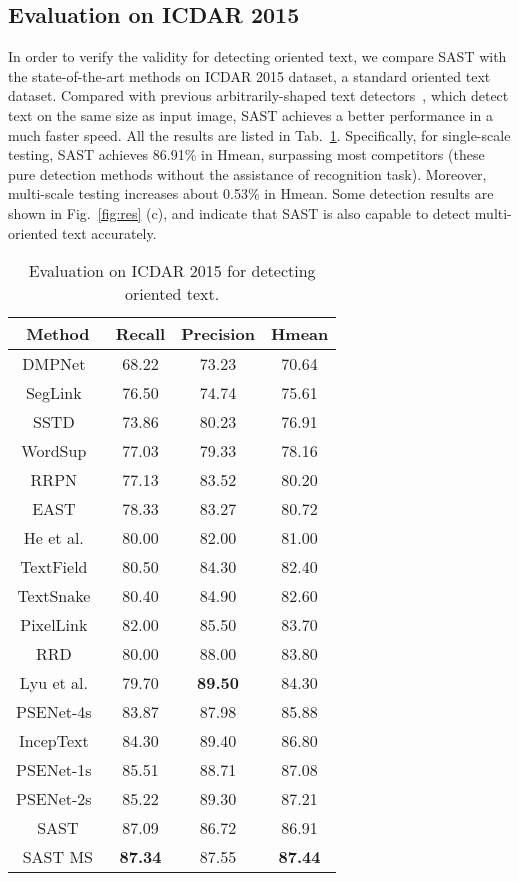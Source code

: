 \documentclass[sigconf]{acmart}
\begin{document}
\subsection{Evaluation on ICDAR 2015}
In order to verify the validity for detecting oriented text, we compare SAST with the state-of-the-art methods on ICDAR 2015 dataset, a standard oriented text dataset. 
Compared with previous arbitrarily-shaped text detectors~\cite{xu2019textfield, yang2018inceptext,wang2019shape}, which detect text on the same size as input image, SAST achieves a better performance in a much faster speed. All the results are listed in Tab.~\ref{tab:ex_icdar15}. Specifically, for single-scale testing, SAST achieves 86.91\% in Hmean, surpassing most competitors (these pure detection methods without the assistance of recognition task). Moreover, multi-scale testing increases about 0.53\% in Hmean. Some detection results are shown in Fig.~\ref{fig:res} (c), and indicate that SAST is also capable to detect multi-oriented text accurately.
\begin{table}
  \caption{ Evaluation on ICDAR 2015 for detecting oriented text.}
  \label{tab:ex_icdar15}
  \begin{tabular}{cccc}
    \toprule
      Method & Recall & Precision & Hmean\\
    \midrule
    DMPNet~\cite{liu2017deep} &68.22 &73.23 &70.64 \\
    SegLink~\cite{shi2017detecting} &76.50 &74.74 &75.61 \\
SSTD~\cite{he2017single} &73.86 &80.23 &76.91 \\
    WordSup~\cite{hu2017wordsup} &77.03 &79.33 &78.16 \\
RRPN~\cite{ma2018arbitrary} &77.13 &83.52 &80.20 \\
    EAST~\cite{zhou2017east} &78.33 &83.27 &80.72 \\
    He et al.~\cite{he2017deep} &80.00 &82.00 &81.00 \\
    TextField~\cite{xu2019textfield}&80.50 &84.30 &82.40 \\
TextSnake~\cite{long2018textsnake} &80.40 &84.90 &82.60 \\
    PixelLink~\cite{deng2018pixellink} &82.00 &85.50 &83.70 \\
    RRD~\cite{liao2018rotation}&80.00 &88.00 &83.80 \\
Lyu et al.~\cite{lyu2018multi} &79.70 &\textbf{89.50} &84.30 \\
PSENet-4s~\cite{wang2019shape} &83.87 &87.98 &85.88 \\
IncepText~\cite{yang2018inceptext} &84.30 &89.40 &86.80 \\
PSENet-1s~\cite{wang2019shape} &85.51 &88.71 &87.08 \\
PSENet-2s~\cite{wang2019shape} &85.22 &89.30 &87.21 \\
\midrule
SAST     &87.09 &86.72 	& 86.91  \\
    SAST MS  &\textbf{87.34} &87.55 	& \textbf{87.44} \\
  \bottomrule
\end{tabular}
\end{table}
\end{document}
